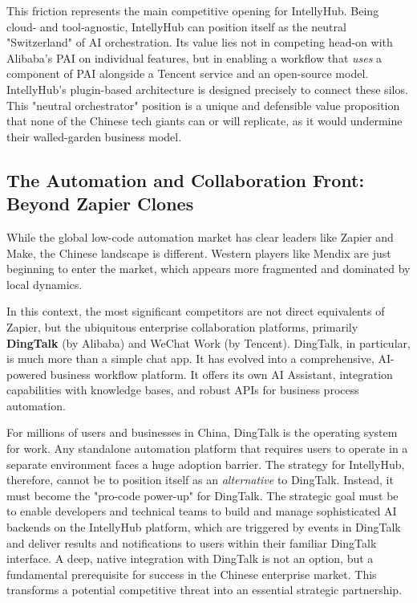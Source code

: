\documentclass[11pt, a4paper, oneside]{article}
\begin{document}
This friction represents the main competitive opening for IntellyHub. Being cloud- and tool-agnostic, IntellyHub can position itself as the neutral "Switzerland" of AI orchestration. Its value lies not in competing head-on with Alibaba's PAI on individual features, but in enabling a workflow that \textit{uses} a component of PAI alongside a Tencent service and an open-source model. IntellyHub's plugin-based architecture is designed precisely to connect these silos\cite{IntellyHubBP}. This "neutral orchestrator" position is a unique and defensible value proposition that none of the Chinese tech giants can or will replicate, as it would undermine their walled-garden business model.

\subsection{The Automation and Collaboration Front: Beyond Zapier Clones}
While the global low-code automation market has clear leaders like Zapier and Make\cite{MakeAlternatives, MakeAlternatives2, MakeVsZapier}, the Chinese landscape is different. Western players like Mendix are just beginning to enter the market\cite{MendixChina}, which appears more fragmented and dominated by local dynamics.

In this context, the most significant competitors are not direct equivalents of Zapier, but the ubiquitous enterprise collaboration platforms, primarily \textbf{DingTalk} (by Alibaba) and WeChat Work (by Tencent). DingTalk, in particular, is much more than a simple chat app. It has evolved into a comprehensive, AI-powered business workflow platform. It offers its own AI Assistant, integration capabilities with knowledge bases, and robust APIs for business process automation\cite{DingTalkAI, DingTalkAPI}.

For millions of users and businesses in China, DingTalk is the operating system for work. Any standalone automation platform that requires users to operate in a separate environment faces a huge adoption barrier. The strategy for IntellyHub, therefore, cannot be to position itself as an \textit{alternative} to DingTalk. Instead, it must become the "pro-code power-up" for DingTalk. The strategic goal must be to enable developers and technical teams to build and manage sophisticated AI backends on the IntellyHub platform, which are triggered by events in DingTalk and deliver results and notifications to users within their familiar DingTalk interface. A deep, native integration with DingTalk is not an option, but a fundamental prerequisite for success in the Chinese enterprise market. This transforms a potential competitive threat into an essential strategic partnership.
\end{document}

